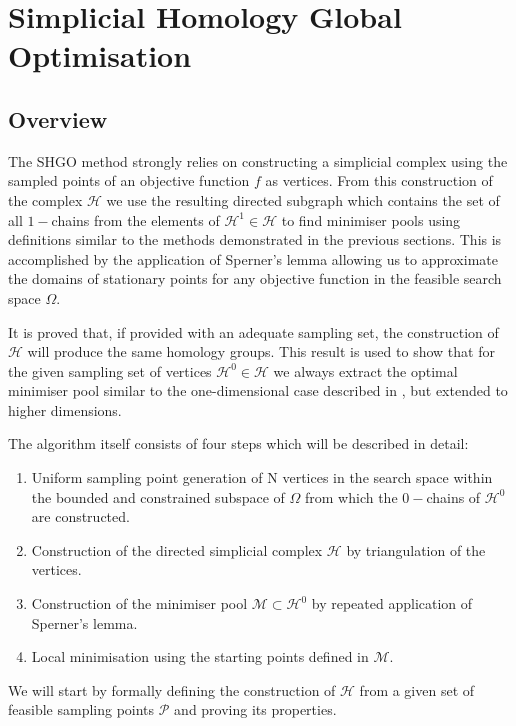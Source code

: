 \chapter{Simplicial Homology Global Optimisation}  \label{sec:shgo}
\section{Overview}
The SHGO method strongly relies on constructing a simplicial complex using the sampled points of an objective function $f$ as vertices. From this construction of the complex $\mathcal{H}$ we use the resulting directed subgraph which contains the set of all $1-$chains from the elements of $\mathcal{H}^1 \in \mathcal{H}$ to find minimiser pools using definitions similar to the methods demonstrated in the previous sections. This is accomplished by the application of Sperner's lemma \citep{Sperner1928} allowing us to approximate the domains of stationary points for any objective function in the feasible search space $\Omega$. 

It is proved that, if provided with an adequate sampling set, the construction of $\mathcal{H}$ will produce the same homology groups. This result is used to show that for the given sampling set of vertices $\mathcal{H}^0 \in \mathcal{H}$ we always extract the optimal minimiser pool similar to the one-dimensional case described in , but extended to higher dimensions. 

The algorithm itself consists of four steps which will be described in detail:
\begin{enumerate}
\item Uniform sampling point generation of N vertices in the search space within the bounded and constrained subspace of $\Omega$ from which the $0-$chains of $\mathcal{H}^0$ are constructed.
\item Construction of the directed simplicial complex $\mathcal{H}$ by triangulation of the vertices.
\item Construction of the minimiser pool $\mathcal{M} \subset \mathcal{H}^0$ by repeated application of Sperner's lemma.%
\item Local minimisation using the starting points defined in $\mathcal{M}$.
\end{enumerate}

We will start by formally defining the construction of $\mathcal{H}$ from a given set of feasible sampling points $\mathcal{P}$ and proving its properties. %


